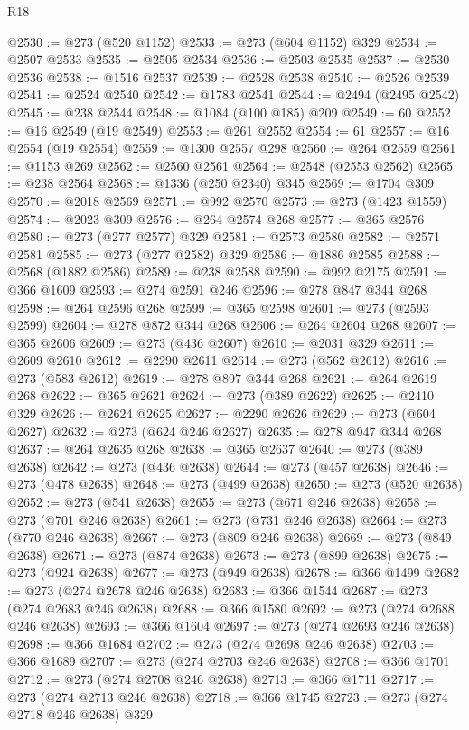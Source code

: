 \begin{lexlean}{R18}
\begin{coremodule}
{{{{{{{{{{{{{{{{{{{@2530 := @273 (@520 @1152)
@2533 := @273 (@604 @1152) @329
@2534 := @2507 @2533
@2535 := @2505 @2534
@2536 := @2503 @2535
@2537 := @2530 @2536
@2538 := @1516 @2537
@2539 := @2528 @2538
@2540 := @2526 @2539
@2541 := @2524 @2540
@2542 := @1783 @2541
@2544 := @2494 (@2495 @2542)
@2545 := @238 @2544
@2548 := @1084 (@100 @185) @209
@2549 := 60
@2552 := @16 @2549 (@19 @2549)
@2553 := @261 @2552
@2554 := 61
@2557 := @16 @2554 (@19 @2554)
@2559 := @1300 @2557 @298
@2560 := @264 @2559
@2561 := @1153 @269
@2562 := @2560 @2561
@2564 := @2548 (@2553 @2562)
@2565 := @238 @2564
@2568 := @1336 (@250 @2340) @345
@2569 := @1704 @309
@2570 := @2018 @2569
@2571 := @992 @2570
@2573 := @273 (@1423 @1559)
@2574 := @2023 @309
@2576 := @264 @2574 @268
@2577 := @365 @2576
@2580 := @273 (@277 @2577) @329
@2581 := @2573 @2580
@2582 := @2571 @2581
@2585 := @273 (@277 @2582) @329
@2586 := @1886 @2585
@2588 := @2568 (@1882 @2586)
@2589 := @238 @2588
@2590 := @992 @2175
@2591 := @366 @1609
@2593 := @274 @2591 @246
@2596 := @278 @847 @344 @268
@2598 := @264 @2596 @268
@2599 := @365 @2598
@2601 := @273 (@2593 @2599)
@2604 := @278 @872 @344 @268
@2606 := @264 @2604 @268
@2607 := @365 @2606
@2609 := @273 (@436 @2607)
@2610 := @2031 @329
@2611 := @2609 @2610
@2612 := @2290 @2611
@2614 := @273 (@562 @2612)
@2616 := @273 (@583 @2612)
@2619 := @278 @897 @344 @268
@2621 := @264 @2619 @268
@2622 := @365 @2621
@2624 := @273 (@389 @2622)
@2625 := @2410 @329
@2626 := @2624 @2625
@2627 := @2290 @2626
@2629 := @273 (@604 @2627)
@2632 := @273 (@624 @246 @2627)
@2635 := @278 @947 @344 @268
@2637 := @264 @2635 @268
@2638 := @365 @2637
@2640 := @273 (@389 @2638)
@2642 := @273 (@436 @2638)
@2644 := @273 (@457 @2638)
@2646 := @273 (@478 @2638)
@2648 := @273 (@499 @2638)
@2650 := @273 (@520 @2638)
@2652 := @273 (@541 @2638)
@2655 := @273 (@671 @246 @2638)
@2658 := @273 (@701 @246 @2638)
@2661 := @273 (@731 @246 @2638)
@2664 := @273 (@770 @246 @2638)
@2667 := @273 (@809 @246 @2638)
@2669 := @273 (@849 @2638)
@2671 := @273 (@874 @2638)
@2673 := @273 (@899 @2638)
@2675 := @273 (@924 @2638)
@2677 := @273 (@949 @2638)
@2678 := @366 @1499
@2682 := @273 (@274 @2678 @246 @2638)
@2683 := @366 @1544
@2687 := @273 (@274 @2683 @246 @2638)
@2688 := @366 @1580
@2692 := @273 (@274 @2688 @246 @2638)
@2693 := @366 @1604
@2697 := @273 (@274 @2693 @246 @2638)
@2698 := @366 @1684
@2702 := @273 (@274 @2698 @246 @2638)
@2703 := @366 @1689
@2707 := @273 (@274 @2703 @246 @2638)
@2708 := @366 @1701
@2712 := @273 (@274 @2708 @246 @2638)
@2713 := @366 @1711
@2717 := @273 (@274 @2713 @246 @2638)
@2718 := @366 @1745
@2723 := @273 (@274 @2718 @246 @2638) @329
}}}}}}}}}}}}}}}}}}}
\end{coremodule}
\end{lexlean}
